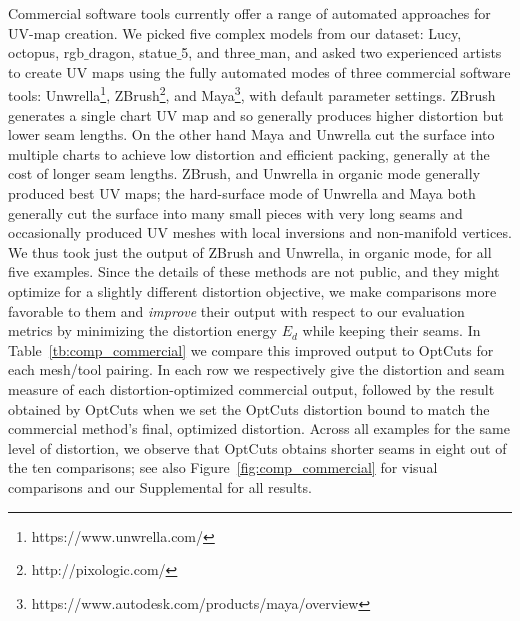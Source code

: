 Commercial software tools currently offer a range of automated approaches for UV-map creation.
We picked five complex models from our dataset: Lucy, octopus, rgb$\_$dragon, statue$\_$5, and three$\_$man, and asked two experienced artists to create UV maps using the fully automated modes of three commercial software tools: Unwrella\footnote{https://www.unwrella.com/}, ZBrush\footnote{http://pixologic.com/}, and Maya\footnote{https://www.autodesk.com/products/maya/overview}, with default parameter settings. ZBrush generates a single chart UV map and so generally produces higher distortion but lower seam lengths. On the other hand Maya and Unwrella cut the surface into multiple charts to achieve low distortion and efficient packing, generally at the cost of longer seam lengths. ZBrush, and Unwrella in organic mode generally produced best UV maps; the hard-surface mode of Unwrella and Maya both generally cut the surface into many small pieces with very long seams and occasionally produced UV meshes with local inversions and non-manifold vertices. We thus took just the output of ZBrush and Unwrella, in organic mode, for all five examples.  Since the details of these methods are not public, and they might optimize for a slightly different distortion objective, we make comparisons more favorable to them and \emph{improve} their output with respect to our evaluation metrics by minimizing the distortion energy $E_d$ while keeping their seams. In Table\ \ref{tb:comp_commercial} we compare this improved output to OptCuts for each mesh/tool pairing. In each row we respectively give the distortion and seam measure of each distortion-optimized commercial output, followed by the result obtained by OptCuts when we set the OptCuts distortion bound to match the commercial method's final, optimized distortion. Across all examples for the same level of distortion, we observe that OptCuts obtains shorter seams in eight out of the ten comparisons; see also Figure\ \ref{fig:comp_commercial} for visual comparisons and our Supplemental for all results.



